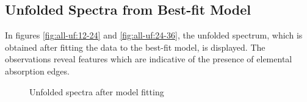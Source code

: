     	\subsection{Unfolded Spectra from Best-fit Model} \label{multi-obs:results:unfolded}
    		In figures \ref{fig:all-uf:12-24} and \ref{fig:all-uf:24-36}, the unfolded spectrum, which is obtained after fitting the data to the best-fit model, is displayed. The observations reveal features which are indicative of the presence of elemental absorption edges.
    		
    		\begin{figure}[h!]
				\centering				
				

				\caption{Unfolded spectra after model fitting}
		        \label{fig:all-uf}
			\end{figure}
    		
%
    	
